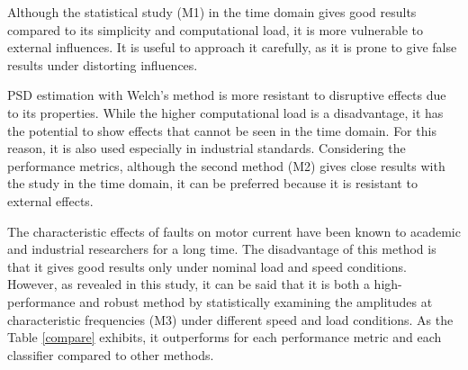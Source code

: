 Although the statistical study (M1) in the time domain gives good results compared to its simplicity and computational load, it is more vulnerable to external influences. It is useful to approach it carefully, as it is prone to give false results under distorting influences.

PSD estimation with Welch's method is more resistant to disruptive effects due to its properties. While the higher computational load is a disadvantage, it has the potential to show effects that cannot be seen in the time domain. For this reason, it is also used especially in industrial standards. Considering the performance metrics, although the second method (M2) gives close results with the study in the time domain, it can be preferred because it is resistant to external effects.

The characteristic effects of faults on motor current have been known to academic and industrial researchers for a long time. The disadvantage of this method is that it gives good results only under nominal load and speed conditions. However, as revealed in this study, it can be said that it is both a high-performance and robust method by statistically examining the amplitudes at characteristic frequencies (M3) under different speed and load conditions. As the Table \ref{compare} exhibits, it outperforms for each performance metric and each classifier compared to other methods.

